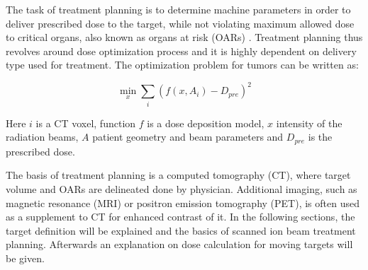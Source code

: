 The task of treatment planning is to determine machine parameters in order to deliver prescribed dose to the target, while not violating maximum allowed dose to critical organs, also known as organs at risk (OARs) \cite{Richter2012}.
Treatment planning thus revolves around dose optimization process and it is highly dependent on delivery type used for treatment. The optimization problem for tumors can be written as:

\begin{equation}
  \min_{x} \sum_{i} \left( f(x,A_i) - D_{pre} \right)^2 
\end{equation}

Here $i$ is a CT voxel, function $f$ is a dose deposition model, $x$ intensity of the radiation beams, $A$ patient geometry and beam parameters and $D_{pre}$ is the prescribed dose.

The basis of treatment planning is a computed tomography (CT), where target volume and OARs are delineated
done by physician. Additional imaging, such as magnetic resonance (MRI) or positron emission tomography (PET), is often used as a supplement to CT for enhanced contrast of it. In the following sections, the target definition will be explained and the basics of scanned ion beam treatment planning. Afterwards an explanation on dose calculation for moving targets will be given.

